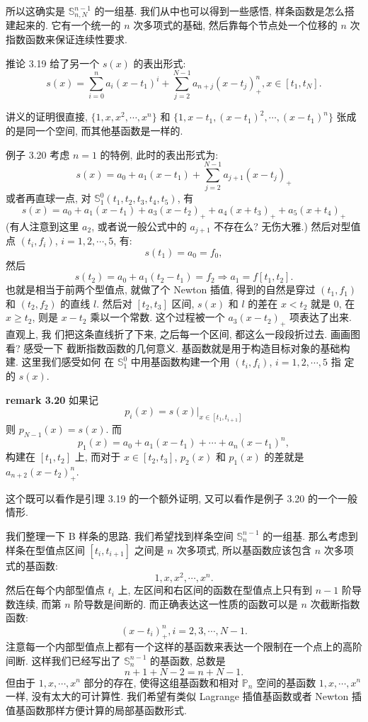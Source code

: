 \documentclass[a4paper]{ctexart}
\begin{document}
所以这确实是 $\mathbb{S}_{n, N}^{n - 1}$ 的一组基. 我们从中也可以得到一些感悟, 
样条函数是怎么搭建起来的. 它有一个统一的 $n$ 次多项式的基础,
然后靠每个节点处一个位移的 $n$ 次指数函数来保证连续性要求.

推论 3.19 给了另一个 $s(x)$ 的表出形式:
$$
s(x) = \sum_{i = 0}^n a_i(x - t_1)^i + \sum_{j = 2}^{N - 1}a_{n + j}(x - t_j)_+^n,
 x \in [t_1, t_N].
$$

讲义的证明很直接, $\{1, x, x^2, \cdots, x^n\}$ 和 $\{1, x - t_1, (x - t_1)^2, \cdots,
 (x - t_1)^n\}$ 张成的是同一个空间, 而其他基函数是一样的.

例子 3.20 考虑 $n = 1$ 的特例, 此时的表出形式为:
$$
s(x) = a_0 + a_1 (x - t_1) + \sum_{j = 2}^{N - 1} a_{j + 1} (x - t_j)_+
$$
或者再直球一点, 对 $\mathbb{S}_1^0(t_1, t_2, t_3, t_4, t_5)$, 有
$$
s(x) = a_0 + a_1 (x - t_1) + a_3 (x - t_2)_+ + a_4 (x + t_3)_+ + a_5 (x + t_4)_+
$$
(有人注意到这里 $a_2$, 或者说一般公式中的 $a_{j + 1}$ 不存在么? 无伤大雅.)
然后对型值点 $(t_i, f_i)$, $i = 1, 2, \cdots, 5$, 有:
$$
s(t_1) = a_0 = f_0,
$$
然后
$$
s(t_2) = a_0 + a_1 (t_2 - t_1) = f_2 \Rightarrow a_1 = f[t_1, t_2].
$$
也就是相当于前两个型值点, 就做了个 Newton 插值, 得到的自然是穿过
$(t_1, f_1)$ 和 $(t_2, f_2)$ 的直线 $l$. 然后对 $[t_2, t_3]$ 区间,
$s(x)$ 和 $l$ 的差在 $x < t_2$ 就是 $0$, 在 $x \geq t_2$, 则是 $x - t_2$
乘以一个常数. 这个过程被一个 $a_3 (x - t_2)_+$ 项表达了出来. 直观上, 我
们把这条直线折了下来, 之后每一个区间, 都这么一段段折过去. 画画图看? 感受一下
截断指数函数的几何意义. 基函数就是用于构造目标对象的基础构建. 这里我们感受如何
在 $\mathbb{S}_1^0$ 中用基函数构建一个用 $(t_i, f_i)$, $i = 1, 2, \cdots, 5$ 指
定的 $s(x)$.

{\bf remark 3.20} 如果记
$$
p_i(x) = \left.s(x)\right|_{x \in [t_1, t_{i + 1}]} 
$$
则 $p_{N - 1}(x) = s(x)$. 而
$$
p_1(x) = a_0 + a_1(x - t_1) + \cdots + a_n(x - t_1)^n,
$$
构建在 $[t_1, t_2]$ 上, 而对于 $x \in [t_2, t_3]$,
$p_2(x)$ 和 $p_1(x)$ 的差就是$a_{n + 2}(x - t_2)^n_+$.

这个既可以看作是引理 3.19 的一个额外证明, 又可以看作是例子 3.20 的一个一般情形.

我们整理一下 B 样条的思路. 我们希望找到样条空间 $\mathbb{S}_{n}^{n - 1}$ 的一组基.
那么考虑到样条在型值点区间 $[t_i, t_{i + 1}]$ 之间是 $n$ 次多项式, 
所以基函数应该包含 $n$ 次多项式的基函数:
$$
1, x, x^2, \cdots, x^n.
$$ 
然后在每个内部型值点 $t_i$ 上, 左区间和右区间的函数在型值点上只有到 $n - 1$ 阶导数连续,
而第 $n$ 阶导数是间断的. 而正确表达这一性质的函数可以是 $n$ 次截断指数函数: 
$$
(x - t_i)^n_+, i = 2, 3, \cdots, N - 1.
$$
注意每一个内部型值点上都有一个这样的基函数来表达一个限制在一个点上的高阶间断. 
这样我们已经写出了 $\mathbb{S}_{n}^{n - 1}$ 的基函数, 总数是
$$
n + 1 + N - 2 = n + N - 1.
$$
但由于 $1, x, \cdots, x^n$ 部分的存在, 使得这组基函数和相对 $\mathbb{P}_n$ 
空间的基函数 $1, x, \cdots, x^n$ 一样, 没有太大的可计算性. 我们希望有类似
Lagrange 插值基函数或者 Newton 插值基函数那样方便计算的局部基函数形式. 
\end{document}
